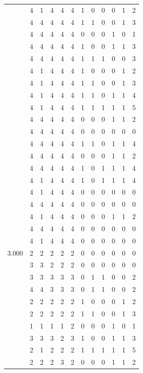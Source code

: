 \documentclass[]{msu-thesis}
\theoremstyle{definition}
\theoremstyle{definition}
\theoremstyle{definition}
\theoremstyle{remark}
\begin{document}
\begin{table}
{\begin{tabular}[t]{rrrrrrrrrrrr}
 & 4 & 1 & 4 & 4 & 4 & 1 & 0 & 0 & 0 & 1 & 2\\
 & 4 & 4 & 4 & 4 & 4 & 1 & 1 & 0 & 0 & 1 & 3\\
 & 4 & 4 & 4 & 4 & 4 & 0 & 0 & 0 & 1 & 0 & 1\\
 & 4 & 4 & 4 & 4 & 4 & 1 & 0 & 0 & 1 & 1 & 3\\
 & 4 & 4 & 4 & 4 & 4 & 1 & 1 & 1 & 0 & 0 & 3\\
 & 4 & 1 & 4 & 4 & 4 & 1 & 0 & 0 & 0 & 1 & 2\\
 & 4 & 1 & 4 & 4 & 4 & 1 & 1 & 0 & 0 & 1 & 3\\
 & 4 & 1 & 4 & 4 & 4 & 1 & 1 & 0 & 1 & 1 & 4\\
 & 4 & 1 & 4 & 4 & 4 & 1 & 1 & 1 & 1 & 1 & 5\\
 & 4 & 4 & 4 & 4 & 4 & 0 & 0 & 0 & 1 & 1 & 2\\
 & 4 & 4 & 4 & 4 & 4 & 0 & 0 & 0 & 0 & 0 & 0\\
 & 4 & 4 & 4 & 4 & 4 & 1 & 1 & 0 & 1 & 1 & 4\\
 & 4 & 4 & 4 & 4 & 4 & 0 & 0 & 0 & 1 & 1 & 2\\
 & 4 & 4 & 4 & 4 & 4 & 1 & 0 & 1 & 1 & 1 & 4\\
 & 4 & 1 & 4 & 4 & 4 & 1 & 0 & 1 & 1 & 1 & 4\\
 & 4 & 1 & 4 & 4 & 4 & 0 & 0 & 0 & 0 & 0 & 0\\
 & 4 & 4 & 4 & 4 & 4 & 0 & 0 & 0 & 0 & 0 & 0\\
 & 4 & 1 & 4 & 4 & 4 & 0 & 0 & 0 & 1 & 1 & 2\\
 & 4 & 4 & 4 & 4 & 4 & 0 & 0 & 0 & 0 & 0 & 0\\
 & 4 & 1 & 4 & 4 & 4 & 0 & 0 & 0 & 0 & 0 & 0\\
3.000 & 2 & 2 & 2 & 2 & 2 & 0 & 0 & 0 & 0 & 0 & 0\\
 & 3 & 3 & 2 & 2 & 2 & 0 & 0 & 0 & 0 & 0 & 0\\
 & 3 & 3 & 3 & 3 & 3 & 0 & 1 & 1 & 0 & 0 & 2\\
 & 4 & 4 & 3 & 3 & 3 & 0 & 1 & 1 & 0 & 0 & 2\\
 & 2 & 2 & 2 & 2 & 2 & 1 & 0 & 0 & 0 & 1 & 2\\
 & 2 & 2 & 2 & 2 & 2 & 1 & 1 & 0 & 0 & 1 & 3\\
 & 1 & 1 & 1 & 1 & 2 & 0 & 0 & 0 & 1 & 0 & 1\\
 & 3 & 3 & 3 & 2 & 3 & 1 & 0 & 0 & 1 & 1 & 3\\
 & 2 & 1 & 2 & 2 & 2 & 1 & 1 & 1 & 1 & 1 & 5\\
 & 2 & 2 & 2 & 3 & 2 & 0 & 0 & 0 & 1 & 1 & 2\\

\end{tabular}}
\end{table}
\end{document}
